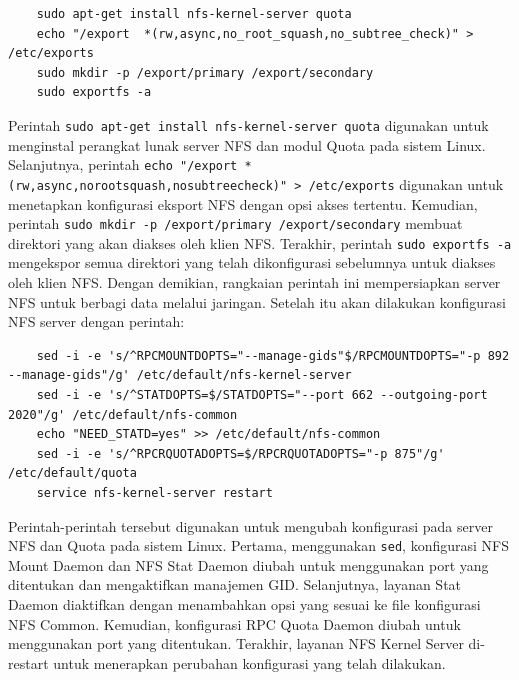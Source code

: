 \begin{listing}[H]
    \begin{verbatim}
    sudo apt-get install nfs-kernel-server quota
    echo "/export  *(rw,async,no_root_squash,no_subtree_check)" > /etc/exports
    sudo mkdir -p /export/primary /export/secondary
    sudo exportfs -a
    \end{verbatim}
\end{listing}

Perintah \texttt{sudo apt-get install nfs-kernel-server quota} digunakan untuk menginstal perangkat lunak server NFS dan modul Quota pada sistem Linux. Selanjutnya, perintah \texttt{echo "/export *(rw,async,no\textunderscore root\textunderscore squash,no\textunderscore subtree\textunderscore check)" > /etc/exports} digunakan untuk menetapkan konfigurasi eksport NFS dengan opsi akses tertentu. Kemudian, perintah \texttt{sudo mkdir -p /export/primary /export/secondary} membuat direktori yang akan diakses oleh klien NFS. Terakhir, perintah \texttt{sudo exportfs -a} mengekspor semua direktori yang telah dikonfigurasi sebelumnya untuk diakses oleh klien NFS. Dengan demikian, rangkaian perintah ini mempersiapkan server NFS untuk berbagi data melalui jaringan. Setelah itu akan dilakukan konfigurasi NFS server dengan perintah:

\begin{listing}[H]
    \begin{verbatim}
    sed -i -e 's/^RPCMOUNTDOPTS="--manage-gids"$/RPCMOUNTDOPTS="-p 892 --manage-gids"/g' /etc/default/nfs-kernel-server
    sed -i -e 's/^STATDOPTS=$/STATDOPTS="--port 662 --outgoing-port 2020"/g' /etc/default/nfs-common
    echo "NEED_STATD=yes" >> /etc/default/nfs-common
    sed -i -e 's/^RPCRQUOTADOPTS=$/RPCRQUOTADOPTS="-p 875"/g' /etc/default/quota
    service nfs-kernel-server restart
    \end{verbatim}
\end{listing}

Perintah-perintah tersebut digunakan untuk mengubah konfigurasi pada server NFS dan Quota pada sistem Linux. Pertama, menggunakan \texttt{sed}, konfigurasi NFS Mount Daemon dan NFS Stat Daemon diubah untuk menggunakan port yang ditentukan dan mengaktifkan manajemen GID. Selanjutnya, layanan Stat Daemon diaktifkan dengan menambahkan opsi yang sesuai ke file konfigurasi NFS Common. Kemudian, konfigurasi RPC Quota Daemon diubah untuk menggunakan port yang ditentukan. Terakhir, layanan NFS Kernel Server di-restart untuk menerapkan perubahan konfigurasi yang telah dilakukan.

